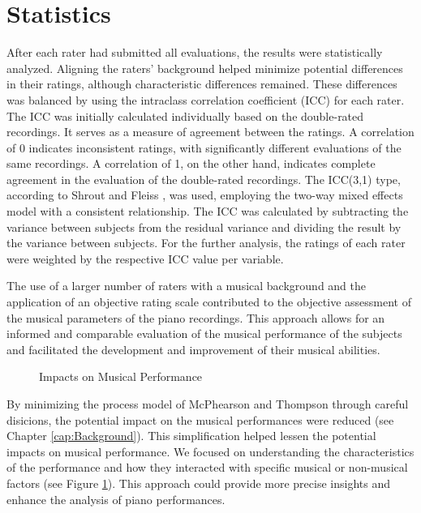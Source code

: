 \section{Statistics}
After each rater had submitted all evaluations, the results were statistically analyzed. Aligning the raters' background helped minimize potential differences in their ratings, although characteristic differences remained. These differences was balanced by using the intraclass correlation coefficient (ICC) for each rater. The ICC was initially calculated individually based on the double-rated recordings. It serves as a measure of agreement between the ratings. A correlation of 0 indicates inconsistent ratings, with significantly different evaluations of the same recordings. A correlation of 1, on the other hand, indicates complete agreement in the evaluation of the double-rated recordings. The ICC(3,1) type, according to Shrout and Fleiss \cite{Shrout1979}, was used, employing the two-way mixed effects model with a consistent relationship. The ICC was calculated by subtracting the variance between subjects from the residual variance and dividing the result by the variance between subjects. For the further analysis, the ratings of each rater were weighted by the respective ICC value per variable. 

The use of a larger number of raters with a musical background and the application of an objective rating scale contributed to the objective assessment of the musical parameters of the piano recordings. This approach allows for an informed and comparable evaluation of the musical performance of the subjects and facilitated the development and improvement of their musical abilities.

\begin{figure}[h]
	\centering
	\def \svgwidth{0.9\textwidth}
	
	\caption{Impacts on Musical Performance}
	\label{fig:interaction}
\end{figure}

By minimizing the process model of McPhearson and Thompson \cite{McPhearson1998} through careful disicions, the potential impact on the musical performances were reduced (see Chapter \ref{cap:Background}). This simplification helped lessen the potential impacts on musical performance. We focused on understanding the characteristics of the performance and how they interacted with specific musical or non-musical factors (see Figure \ref{fig:interaction}). This approach could provide more precise insights and enhance the analysis of piano performances.


